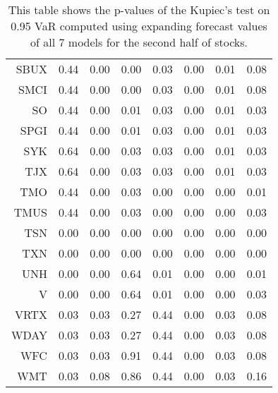 \begin{table}[ht]
\begin{tabular}{rrrrrrrr}
  SBUX & 0.44 & 0.00 & 0.00 & 0.03 & 0.00 & 0.01 & 0.08 \\ 
  SMCI & 0.44 & 0.00 & 0.00 & 0.03 & 0.00 & 0.01 & 0.08 \\ 
  SO & 0.44 & 0.00 & 0.01 & 0.03 & 0.00 & 0.01 & 0.03 \\ 
  SPGI & 0.44 & 0.00 & 0.01 & 0.03 & 0.00 & 0.01 & 0.03 \\ 
  SYK & 0.64 & 0.00 & 0.03 & 0.03 & 0.00 & 0.01 & 0.03 \\ 
  TJX & 0.64 & 0.00 & 0.03 & 0.03 & 0.00 & 0.01 & 0.03 \\ 
  TMO & 0.44 & 0.00 & 0.03 & 0.00 & 0.00 & 0.00 & 0.01 \\ 
  TMUS & 0.44 & 0.00 & 0.03 & 0.00 & 0.00 & 0.00 & 0.03 \\ 
  TSN & 0.00 & 0.00 & 0.00 & 0.00 & 0.00 & 0.00 & 0.00 \\ 
  TXN & 0.00 & 0.00 & 0.00 & 0.00 & 0.00 & 0.00 & 0.00 \\ 
  UNH & 0.00 & 0.00 & 0.64 & 0.01 & 0.00 & 0.00 & 0.01 \\ 
  V & 0.00 & 0.00 & 0.64 & 0.01 & 0.00 & 0.00 & 0.03 \\ 
  VRTX & 0.03 & 0.03 & 0.27 & 0.44 & 0.00 & 0.03 & 0.08 \\ 
  WDAY & 0.03 & 0.03 & 0.27 & 0.44 & 0.00 & 0.03 & 0.08 \\ 
  WFC & 0.03 & 0.03 & 0.91 & 0.44 & 0.00 & 0.03 & 0.08 \\ 
  WMT & 0.03 & 0.08 & 0.86 & 0.44 & 0.00 & 0.03 & 0.16 \\ 
   \hline
\end{tabular}
\caption[Kupiec's test p-values, alpha =0.95 (2)]{This table shows the p-values of the Kupiec's test on 0.95 VaR computed using expanding forecast values of all 7 models for the second half of stocks.} 
\label{Table:Kupiec_test_expanding_0.95_2}
\end{table}
